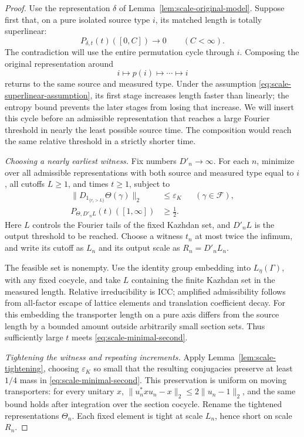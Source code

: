 \begin{proof}
Use the representation \(\delta\) of
Lemma~\ref{lem:scale-original-model}.  Suppose first
that, on a pure isolated source type \(i\), its matched
length is totally superlinear:
\begin{equation}\label{eq:scale-superlinear-assumption}
 P_{\delta,t}(t)([0,C])\longrightarrow0
 \qquad(C<\infty).
\end{equation}
The contradiction will use the entire permutation cycle through $i$.
Composing the original representation around
\[
 i\longmapsto p(i)\longmapsto\cdots\longmapsto i
\]
returns to the same source and measured type. Under the assumption
\eqref{eq:scale-superlinear-assumption}, its first stage increases
length faster than linearly; the entropy bound prevents the later
stages from losing that increase. We will insert this cycle before
an admissible representation that reaches a large Fourier threshold
in nearly the least possible source time. The composition would
reach the same relative threshold in a strictly shorter time.

\emph{Choosing a nearly earliest witness.}
Fix numbers \(D'_n\to\infty\). For each \(n\), minimize
over all admissible representations with both source
and measured type equal to \(i\), all cutoffs \(L\ge1\),
and times \(t\ge1\), subject to
\begin{align}
 \|D_{1_{\{r_i>L\}}}\Theta(\gamma)\|_2
 &\le\varepsilon_K
       &&(\gamma\in\mathcal F),\label{eq:scale-minimal-first}\\
 P_{\Theta,D'_nL}(t)([1,\infty])
 &\ge\tfrac12 .&&\label{eq:scale-minimal-second}
\end{align}
Here $L$ controls the Fourier tails of the fixed Kazhdan set, and
$D'_nL$ is the output threshold to be reached. Choose a witness
\(t_n\) at most twice the infimum, and write its cutoff as
\(L_n\) and its output scale as \(R_n=D'_nL_n\).

The feasible set is nonempty.  Use the identity group
embedding into \(L_\eta(\Gamma)\), with any fixed cocycle,
and take \(L\) containing the finite Kazhdan set in the
measured length.  Relative irreducibility is ICC;
amplified admissibility follows from all-factor escape
of lattice elements and translation coefficient decay.
For this embedding the transporter length on a pure
axis differs from the source length by a bounded amount
outside arbitrarily small section sets.  Thus sufficiently
large \(t\) meets \eqref{eq:scale-minimal-second}.

\emph{Tightening the witness and repeating increments.}
Apply Lemma~\ref{lem:scale-tightening}, choosing
\(\varepsilon_K\) so small that the resulting conjugacies
preserve at least \(1/4\) mass in
\eqref{eq:scale-minimal-second}.  This preservation is
uniform on moving transporters: for every unitary \(x\),
\(\|u_n^*xu_n-x\|_2\le2\|u_n-1\|_2\), and the same
bound holds after integration over the section cocycle.
Rename the tightened representations \(\Theta_n\).
Each fixed element is tight at scale \(L_n\), hence
short on scale \(R_n\).


\end{proof}
